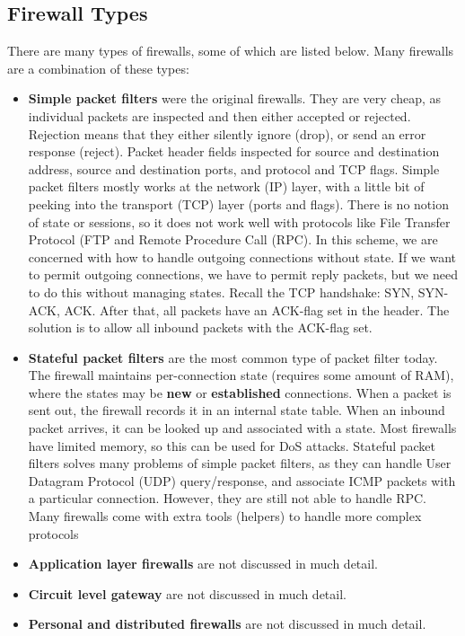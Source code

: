 \documentclass[11pt]{article}
\theoremstyle{plain} %
\theoremstyle{definition}
\theoremstyle{example}
\theoremstyle{remark}
\begin{document}
\subsection{Firewall Types}
There are many types of firewalls, some of which are listed below. Many firewalls are a combination of these types:
\begin{itemize}
	\item \textbf{Simple packet filters} were the original firewalls. They are very cheap, as individual packets are inspected and then either accepted or rejected. Rejection means that they either silently ignore (drop), or send an error response (reject). Packet header fields inspected for source and destination address, source and destination ports, and protocol and TCP flags. Simple packet filters mostly works at the network (IP) layer, with a little bit of peeking into the transport (TCP) layer (ports and flags). There is no notion of state or sessions, so it does not work well with protocols like File Transfer Protocol (FTP and Remote Procedure Call (RPC). In this scheme, we are concerned with how to handle outgoing connections without state. If we want to permit outgoing connections, we have to permit reply packets, but we need to do this without managing states. Recall the TCP handshake: SYN, SYN-ACK, ACK. After that, all packets have an ACK-flag set in the header. The solution is to allow all inbound packets with the ACK-flag set.

	\item \textbf{Stateful packet filters} are the most common type of packet filter today. The firewall maintains per-connection state (requires some amount of RAM), where the states may be \textbf{new} or \textbf{established} connections. 
When a packet is sent out, the firewall records it in an internal state table. When an inbound packet arrives, it can be looked up and associated with a state. Most firewalls have limited memory, so this can be used for DoS attacks. Stateful packet filters solves many problems of simple packet filters, as they can handle User Datagram Protocol (UDP) query/response, and associate ICMP packets with a particular connection. However, they are still not able to handle RPC. Many firewalls come with extra tools (helpers) to handle more complex protocols
	\item \textbf{Application layer firewalls} are not discussed in much detail. 
	\item \textbf{Circuit level gateway} are not discussed in much detail. 
	\item \textbf{Personal and distributed firewalls} are not discussed in much detail. 
\end{itemize}
\end{document}
